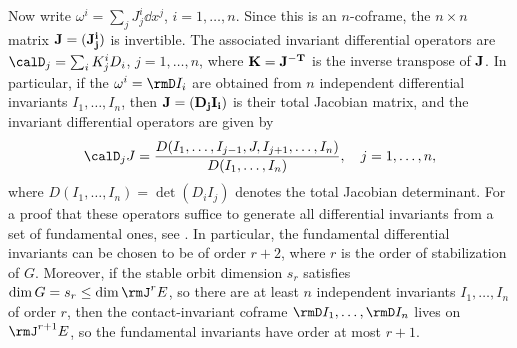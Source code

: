 Now write $\omega^i=\sum_j J^i_j \dd x^j$, $i=1,\ldots,n$. Since this is an $n$-coframe, the $n\times n$ matrix $\bf{J}=(J^i_j)$ is invertible. The associated invariant differential operators are $\calD_j=\sum_i K^i_j D_i$, $j=1,\ldots,n$, where $\bf{K}=\bf{J}^{-T}$ is the inverse transpose of $\bf{J}$. In particular, if the $\omega^i=\rmD I_i$ are obtained from $n$ independent differential invariants $I_1,\ldots,I_n$, then $\bf{J}=(D_j I_i)$ is their total Jacobian matrix, and the invariant differential operators are given by 
\[\calD_j J=\frac{D(I_1,\ldots,I_{j-1},J,I_{j+1},\ldots,I_n)}{D(I_1,\ldots,I_n)},\quad j=1,\ldots,n,\]
where $D(I_1,\ldots,I_n)=\det (D_i I_j)$ denotes the total Jacobian determinant. For a proof that these operators suffice to generate all differential invariants from a set of fundamental ones, see \cite[Thm.~5.48]{Olver93}. In particular, the fundamental differential invariants can be chosen to be of order $r+2$, where $r$ is the order of stabilization of $G$. Moreover, if the stable orbit dimension $s_r$ satisfies $\dim G=s_r\leq \dim \rmJ^r E$, so there are at least $n$ independent invariants $I_1,\ldots,I_n$ of order $r$, then the contact-invariant coframe $\rmD I_1,\ldots,\rmD I_n$ lives on $\rmJ^{r+1}E$, so the fundamental invariants have order at most $r+1$.

